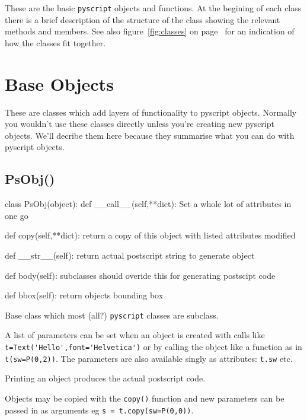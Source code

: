 \documentclass[a4paper]{book}
\begin{document}
These are the basic \Verb|pyscript| objects and functions. At the
begining of each class there is a brief description of the structure
of the class showing the relevant methods and members. See also
figure~\ref{fig:classes} on page~\pageref{fig:classes} for an
indication of how the classes fit together.

\section{Base Objects}

These are classes which add layers of functionality to pyscript objects.
Normally you wouldn't use these classes directly unless you're creating new 
pyscript objects. We'll decribe them here because they summarise what
you can do with pyscript objects.

\subsection{PsObj()}
\label{sec:psobj}
\begin{python}
class PsObj(object):
    def __call__(self,**dict):
        Set a whole lot of attributes in one go

    def copy(self,**dict):
        return a copy of this object
        with listed attributes modified

    def __str__(self):
        return actual postscript string to generate object

    def body(self):
        subclasses should overide this for generating postscipt code

    def bbox(self):
        return objects bounding box
\end{python}

Base class which most (all?) \Verb|pyscript| classes are subclass.

A list of parameters can be set when an object is created with
calls like \Verb|t=Text('Hello',font='Helvetica')|
or by calling the object like a function as in \Verb|t(sw=P(0,2))|.
The parameters are also available singly as attributes: \Verb|t.sw| etc.

Printing an object produces the actual postscript code.

Objects may be copied with the \Verb|copy()| function and new
parameters can be passed in as arguments eg \Verb|s = t.copy(sw=P(0,0))|.

\end{document}
